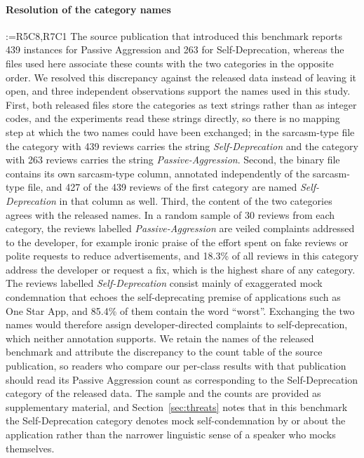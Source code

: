 \documentclass[a4paper,fleqn]{cas-sc}
\makeatletter
\newif\iftracked
\newcommand{\rv@setcolour}[1]{%
  \IfStrEq{#1}{R7C7}{\color{rvEdit}}{%
    \IfSubStr{#1}{R5}{\IfSubStr{#1}{R7}{\color{rvBoth}}{\color{rvFive}}}{\color{rvSeven}}}}
\newcommand{\rv@tag}[1]{\textsuperscript{\sffamily\bfseries\scriptsize[\StrSubstitute{#1}{,}{, }]}\,}
\newcommand{\rv@recordone}[1]{%
  \edef\rv@i{#1}%
  \ifcsdef{rv@n@\rv@i}{}{\csgdef{rv@n@\rv@i}{0}}%
  \csxdef{rv@n@\rv@i}{\the\numexpr\csuse{rv@n@\rv@i}+1\relax}%
  \begingroup\edef\@currentlabel{\rv@i}\label{rv:\rv@i:\csuse{rv@n@\rv@i}}\endgroup}
\newcommand{\rv@record}[1]{\@for\rv@id:=#1\do{\expandafter\rv@recordone\expandafter{\rv@id}}}
\DeclareRobustCommand{\rcx}[2]{\iftracked{\rv@setcolour{#1}\rv@tag{#1}#2}\else#2\fi}
\newenvironment{rcblock}[1]{\rv@record{#1}\iftracked\rv@setcolour{#1}\leavevmode\rv@tag{#1}\fi\ignorespaces}{\par}
\makeatother
\begin{document}
\paragraph{\rcx{R5C8,R7C1}{Resolution of the category names}}
\begin{rcblock}{R5C8,R7C1}
The source publication that introduced this benchmark reports 439 instances for Passive Aggression and 263 for Self-Deprecation, whereas the files used here associate these counts with the two categories in the opposite order. We resolved this discrepancy against the released data instead of leaving it open, and three independent observations support the names used in this study. First, both released files store the categories as text strings rather than as integer codes, and the experiments read these strings directly, so there is no mapping step at which the two names could have been exchanged; in the sarcasm-type file the category with 439 reviews carries the string \textit{Self-Deprecation} and the category with 263 reviews carries the string \textit{Passive-Aggression}. Second, the binary file contains its own sarcasm-type column, annotated independently of the sarcasm-type file, and 427 of the 439 reviews of the first category are named \textit{Self-Deprecation} in that column as well. Third, the content of the two categories agrees with the released names. In a random sample of 30 reviews from each category, the reviews labelled \textit{Passive-Aggression} are veiled complaints addressed to the developer, for example ironic praise of the effort spent on fake reviews or polite requests to reduce advertisements, and 18.3\% of all reviews in this category address the developer or request a fix, which is the highest share of any category. The reviews labelled \textit{Self-Deprecation} consist mainly of exaggerated mock condemnation that echoes the self-deprecating premise of applications such as One Star App, and 85.4\% of them contain the word ``worst''. Exchanging the two names would therefore assign developer-directed complaints to self-deprecation, which neither annotation supports. We retain the names of the released benchmark and attribute the discrepancy to the count table of the source publication, so readers who compare our per-class results with that publication should read its Passive Aggression count as corresponding to the Self-Deprecation category of the released data. The sample and the counts are provided as supplementary material, and Section~\ref{sec:threats} notes that in this benchmark the Self-Deprecation category denotes mock self-condemnation by or about the application rather than the narrower linguistic sense of a speaker who mocks themselves.
\end{rcblock}
\end{document}
